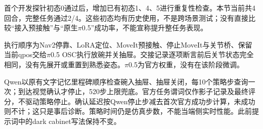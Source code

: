 首个开发探针初态0通过后，增加已有初态1、4、5进行重复性检查。本节当前共4回合，完整任务通过2/4。这些初态均有历史使用，不是跨场景测试；没有直接比较``接入预接触''与``原生\(\pi\)0.5''成功率，不能宣称提升整任务表现。

执行顺序为Nav2停靠、LoRA定位、MoveIt预接触、停止MoveIt与关节桥、保留当前qpos交给\(\pi\)0.5 OSC执行放碗并关抽屉。交接记录逐项断言前后关节状态完全相同，没有先展开或重置到熟悉姿态。\(\pi\)0.5为官方权重，没有在该阶段微调。

Qwen以原有文字记忆里程碑顺序检查碗入抽屉、抽屉关闭，每10个策略步查询一次；到达视觉确认才停止，520步上限兜底。官方任务谓词仅作影子记录及最终评分，不驱动策略停止。确认延迟按Qwen停止步减去首次官方成功步计算，未成功则不计；这只是事后诊断。策略时间仍是仿真步数，不能当端侧实时性能。此前提示词中的dark cabinet写法保持不变。

